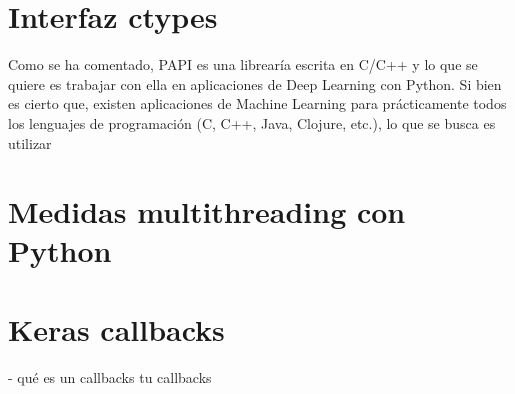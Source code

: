 
\section{Interfaz ctypes}

Como se ha comentado, PAPI es una librearía escrita en C/C++ y lo que se quiere es trabajar con ella en aplicaciones de Deep Learning con Python.
Si bien es cierto que, existen aplicaciones de Machine Learning para prácticamente todos los lenguajes de programación (C, C++, Java, Clojure, etc.), lo que se busca es utilizar



\section{Medidas multithreading con Python}



\section{Keras callbacks}

- qué es un callbacks
tu callbacks

